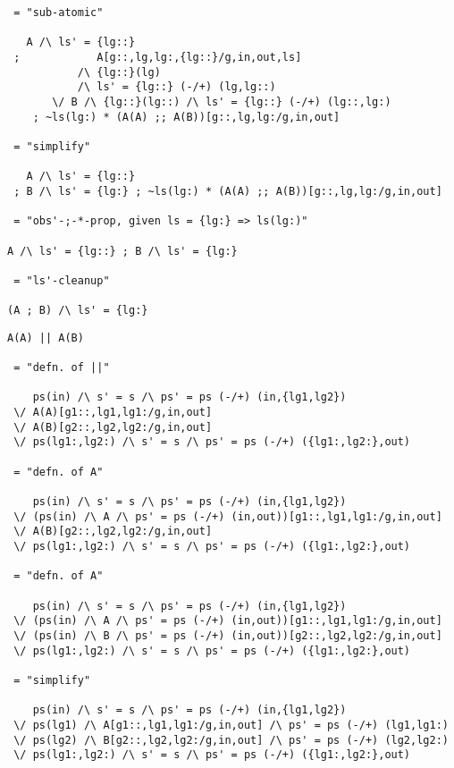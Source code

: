 \begin{verbatim}
 = "sub-atomic"

   A /\ ls' = {lg::}
 ;            A[g::,lg,lg:,{lg::}/g,in,out,ls]
           /\ {lg::}(lg)
           /\ ls' = {lg::} (-/+) (lg,lg::)
       \/ B /\ {lg::}(lg::) /\ ls' = {lg::} (-/+) (lg::,lg:)
    ; ~ls(lg:) * (A(A) ;; A(B))[g::,lg,lg:/g,in,out]

 = "simplify"

   A /\ ls' = {lg::}
 ; B /\ ls' = {lg:} ; ~ls(lg:) * (A(A) ;; A(B))[g::,lg,lg:/g,in,out]

 = "obs'-;-*-prop, given ls = {lg:} => ls(lg:)"

A /\ ls' = {lg::} ; B /\ ls' = {lg:}

 = "ls'-cleanup"

(A ; B) /\ ls' = {lg:}
\end{verbatim}

\newpage
{}

\begin{verbatim}
A(A) || A(B)

 = "defn. of ||"

    ps(in) /\ s' = s /\ ps' = ps (-/+) (in,{lg1,lg2})
 \/ A(A)[g1::,lg1,lg1:/g,in,out]
 \/ A(B)[g2::,lg2,lg2:/g,in,out]
 \/ ps(lg1:,lg2:) /\ s' = s /\ ps' = ps (-/+) ({lg1:,lg2:},out)

 = "defn. of A"

    ps(in) /\ s' = s /\ ps' = ps (-/+) (in,{lg1,lg2})
 \/ (ps(in) /\ A /\ ps' = ps (-/+) (in,out))[g1::,lg1,lg1:/g,in,out]
 \/ A(B)[g2::,lg2,lg2:/g,in,out]
 \/ ps(lg1:,lg2:) /\ s' = s /\ ps' = ps (-/+) ({lg1:,lg2:},out)

 = "defn. of A"

    ps(in) /\ s' = s /\ ps' = ps (-/+) (in,{lg1,lg2})
 \/ (ps(in) /\ A /\ ps' = ps (-/+) (in,out))[g1::,lg1,lg1:/g,in,out]
 \/ (ps(in) /\ B /\ ps' = ps (-/+) (in,out))[g2::,lg2,lg2:/g,in,out]
 \/ ps(lg1:,lg2:) /\ s' = s /\ ps' = ps (-/+) ({lg1:,lg2:},out)

 = "simplify"

    ps(in) /\ s' = s /\ ps' = ps (-/+) (in,{lg1,lg2})
 \/ ps(lg1) /\ A[g1::,lg1,lg1:/g,in,out] /\ ps' = ps (-/+) (lg1,lg1:)
 \/ ps(lg2) /\ B[g2::,lg2,lg2:/g,in,out] /\ ps' = ps (-/+) (lg2,lg2:)
 \/ ps(lg1:,lg2:) /\ s' = s /\ ps' = ps (-/+) ({lg1:,lg2:},out)
\end{verbatim}

